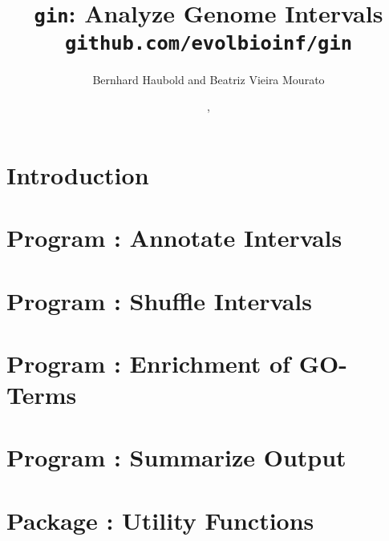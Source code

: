 \documentclass[a4paper]{report}
\begin{document}
\pagestyle{noweb}

\title{\texttt{gin}: Analyze Genome Intervals\\
\small\texttt{github.com/evolbioinf/gin}}
\author{Bernhard Haubold and Beatriz Vieira Mourato}
\date{\!\!, }
\maketitle
\tableofcontents

\chapter{Introduction}

\chapter{Program : Annotate Intervals}\label{ch:an}

\chapter{Program : Shuffle Intervals}\label{ch:sh}

\chapter{Program : Enrichment of GO-Terms}\label{ch:eg}

\chapter{Program : Summarize  Output}\label{ch:su}

\chapter{Package : Utility Functions}\label{ch:ut}


\end{document}
